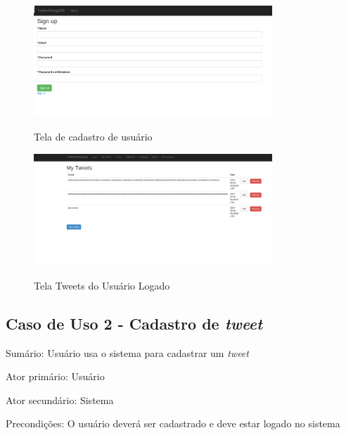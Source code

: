 \begin{figure}[H]
    \centering
    \caption{Tela de cadastro de usuário}
    \includegraphics[width=0.8\textwidth]{./04-figuras/Signup.png}
    \label{fig:signup}
\end{figure}

\begin{figure}[H]
    \centering
    \caption{Tela Tweets do Usuário Logado}
    \includegraphics[width=0.8\textwidth]{./04-figuras/myTweets.png}
    \label{fig:myTweets}
\end{figure}

\subsection{Caso de Uso 2 - Cadastro de \textit{tweet}}
\label{subsec:useCaseCreateTweet}

Sumário: Usuário usa o sistema para cadastrar um \textit{tweet}

Ator primário: Usuário

Ator secundário: Sistema

Precondições: O usuário deverá ser cadastrado e deve estar logado no sistema


